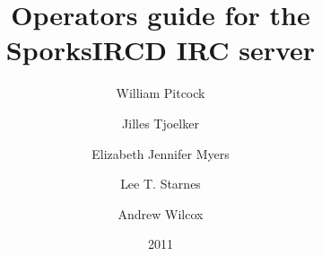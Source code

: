 \documentclass[11pt,letterpaper,twoside]{book}
\title{Operators guide for the SporksIRCD IRC server}
\author{William Pitcock \and Jilles Tjoelker \and Elizabeth Jennifer Myers \and
Lee T. Starnes \and Andrew Wilcox}
\date{2011}
\begin{document}
\label{sporksircd-oper-guide}

\def\DBKlegalblock{
\def\DBKlegaltitle{}
\begin{DBKlegalnotice}

 	Permission is granted to copy, distribute and/or modify this document
	under the terms of the GNU General Public License, Version 2 or any
	later version published by the Free Software Foundation
 
\end{DBKlegalnotice}
}
\maketitle
\tableofcontents








\end{document}
